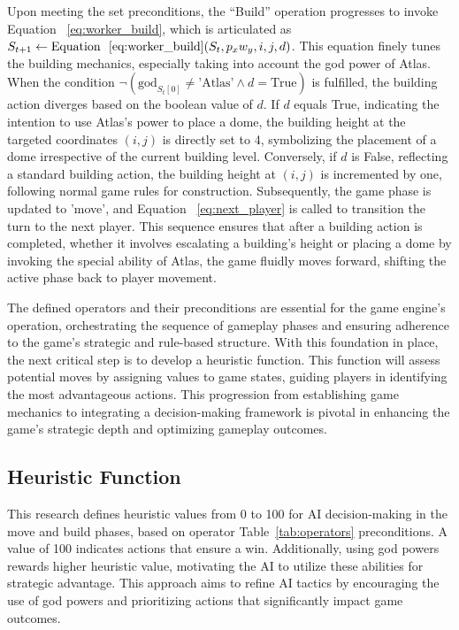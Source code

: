 \documentclass{telkomnika}
\begin{document}
Upon meeting the set preconditions, the ``Build'' operation progresses to invoke Equation ~\ref{eq:worker_build}, which is articulated as \( S_{t+1} \gets \text{Equation ~\ref{eq:worker_build}}(S_t, p_xw_y, i, j, d) \). This equation finely tunes the building mechanics, especially taking into account the god power of Atlas. When the condition \( \neg (\text{god}_{S_t[0]} \neq \text{'Atlas'} \land d = \text{True})\) is fulfilled, the building action diverges based on the boolean value of \( d \). If \( d \) equals True, indicating the intention to use Atlas's power to place a dome, the building height at the targeted coordinates \((i, j)\) is directly set to 4, symbolizing the placement of a dome irrespective of the current building level. Conversely, if \( d \) is False, reflecting a standard building action, the building height at \((i, j)\) is incremented by one, following normal game rules for construction. Subsequently, the game phase is updated to 'move', and Equation ~\ref{eq:next_player} is called to transition the turn to the next player. This sequence ensures that after a building action is completed, whether it involves escalating a building's height or placing a dome by invoking the special ability of Atlas, the game fluidly moves forward, shifting the active phase back to player movement. 

The defined operators and their preconditions are essential for the game engine's operation, orchestrating the sequence of gameplay phases and ensuring adherence to the game's strategic and rule-based structure. With this foundation in place, the next critical step is to develop a heuristic function. This function will assess potential moves by assigning values to game states, guiding players in identifying the most advantageous actions. This progression from establishing game mechanics to integrating a decision-making framework is pivotal in enhancing the game's strategic depth and optimizing gameplay outcomes.

\subsection{Heuristic Function}

This research defines heuristic values from 0 to 100 for AI decision-making in the move and build phases, based on operator Table~\ref{tab:operators} preconditions. A value of 100 indicates actions that ensure a win. Additionally, using god powers rewards higher heuristic value, motivating the AI to utilize these abilities for strategic advantage. This approach aims to refine AI tactics by encouraging the use of god powers and prioritizing actions that significantly impact game outcomes.
\end{document}
